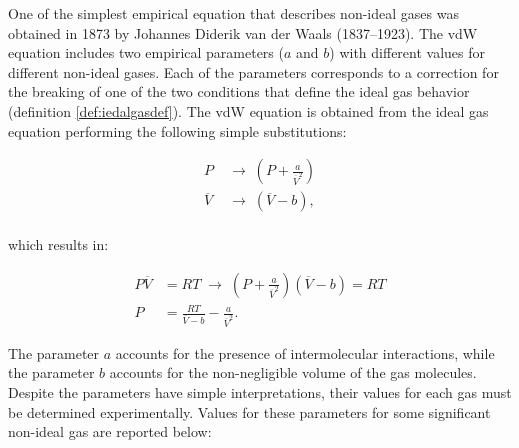 \documentclass[
  9pt,
]{extbook}
\theoremstyle{definition}
\theoremstyle{definition}
\theoremstyle{definition}
\theoremstyle{remark}
\begin{document}
One of the simplest empirical equation that describes non-ideal gases was obtained in 1873 by Johannes Diderik van der Waals (1837--1923). The vdW equation includes two empirical parameters (\(a\) and \(b\)) with different values for different non-ideal gases. Each of the parameters corresponds to a correction for the breaking of one of the two conditions that define the ideal gas behavior (definition \ref{def:iedalgasdef}). The vdW equation is obtained from the ideal gas equation performing the following simple substitutions:

\begin{equation}
\begin{aligned}
P & \;\rightarrow\;\left( P + \frac{a}{\overline{V}^2} \right)\\
\overline{V} & \;\rightarrow\;\left( \overline{V} - b\right),\\
\end{aligned}
\label{eq:vdWeq1}
\end{equation}

which results in:

\begin{equation}
\begin{aligned}
P\overline{V} &=RT \; \rightarrow \; \left( P + \frac{a}{\overline{V}^2} \right)\left( \overline{V} - b\right)=RT\\
P &=\frac{RT}{\overline{V} - b}-\frac{a}{\overline{V}^2}.
\end{aligned}
\label{eq:vdWeq2}
\end{equation}

The parameter \(a\) accounts for the presence of intermolecular interactions, while the parameter \(b\) accounts for the non-negligible volume of the gas molecules. Despite the parameters have simple interpretations, their values for each gas must be determined experimentally. Values for these parameters for some significant non-ideal gas are reported below:

\scriptsize
\end{document}
